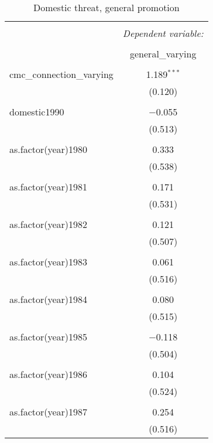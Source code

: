 \documentclass[12pt,letterpaper]{article}
\begin{document}
\begin{table}[!htbp] \centering 
	\caption{Domestic threat, general promotion} 
	\resizebox{0.2\textwidth}{!}
	{ 
	\label{}
	\setlength{\tabcolsep}{0pt}
	\rmfamily
	\scriptsize 
	\begin{tabular}{@{\extracolsep{5pt}}lc} 
		\\[-1.8ex]\hline 
		\hline \\[-1.8ex] 
		& \multicolumn{1}{c}{\textit{Dependent variable:}} \\ 
		\cline{2-2} 
		\\[-1.8ex] & general\_varying \\ 
		\hline \\[-1.8ex] 
		cmc\_connection\_varying & 1.189$^{***}$ \\ 
		& (0.120) \\ 
		& \\ 
		domestic1990 & $-$0.055 \\ 
		& (0.513) \\ 
		& \\ 
		as.factor(year)1980 & 0.333 \\ 
		& (0.538) \\ 
		& \\ 
		as.factor(year)1981 & 0.171 \\ 
		& (0.531) \\ 
		& \\ 
		as.factor(year)1982 & 0.121 \\ 
		& (0.507) \\ 
		& \\ 
		as.factor(year)1983 & 0.061 \\ 
		& (0.516) \\ 
		& \\ 
		as.factor(year)1984 & 0.080 \\ 
		& (0.515) \\ 
		& \\ 
		as.factor(year)1985 & $-$0.118 \\ 
		& (0.504) \\ 
		& \\ 
		as.factor(year)1986 & 0.104 \\ 
		& (0.524) \\ 
		& \\ 
		as.factor(year)1987 & 0.254 \\ 
		& (0.516) \\ 

\end{tabular}}
\end{table}
\end{document}
